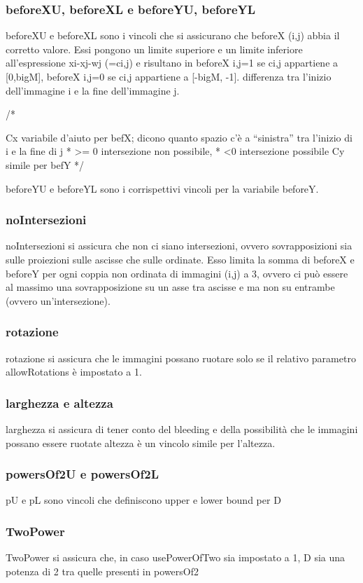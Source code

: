 \subsubsection{beforeXU, beforeXL e beforeYU, beforeYL}
beforeXU e beforeXL sono i vincoli che si assicurano che beforeX (i,j) abbia il corretto valore. Essi pongono un limite superiore e un limite inferiore all'espressione xi-xj-wj (=ci,j) e risultano in beforeX i,j=1 se ci,j appartiene a [0,bigM], beforeX i,j=0 se ci,j appartiene a [-bigM, -1].
differenza tra l'inizio dell'immagine i e  la fine dell'immagine j.






/*


Cx variabile d'aiuto per befX; dicono quanto spazio c'è a “sinistra” tra l'inizio di i e la fine di j
* >= 0 intersezione non possibile, 
* <0 intersezione possibile
Cy simile per befY
*/




beforeYU e beforeYL sono i corrispettivi vincoli per la variabile beforeY.


\subsubsection{noIntersezioni}
noIntersezioni si assicura che non ci siano intersezioni, ovvero sovrapposizioni sia sulle proiezioni sulle ascisse che sulle ordinate. Esso limita la somma di beforeX e beforeY per ogni coppia non ordinata di immagini (i,j) a 3, ovvero ci può essere al massimo una sovrapposizione su un asse tra ascisse e ma non su entrambe (ovvero un'intersezione).



\subsubsection{rotazione}
rotazione si assicura che le immagini possano ruotare solo se il relativo parametro allowRotations è impostato a 1.





\subsubsection{larghezza e altezza}
larghezza si assicura di tener conto del bleeding e della possibilità che le immagini possano essere ruotate
altezza è un vincolo simile per l'altezza. \\


\subsubsection{powersOf2U e powersOf2L}
pU e pL sono vincoli che definiscono upper e lower bound per D

\subsubsection{TwoPower}
TwoPower si assicura che, in caso usePowerOfTwo sia impostato a 1, D sia una potenza di 2 tra quelle presenti in powersOf2 




